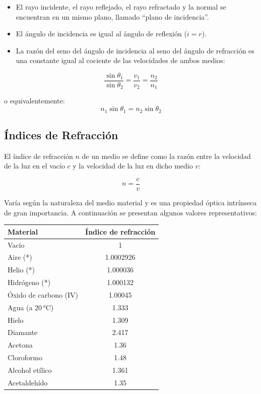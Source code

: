 \documentclass[12pt, a4paper]{article}
\theoremstyle{definition}
\begin{document}
\begin{itemize}
  \item El rayo incidente, el rayo reflejado, el rayo refractado y la normal se encuentran en
        un mismo plano, llamado ``plano de incidencia''.
  \item El ángulo de incidencia es igual al ángulo de reflexión (\(i = r\)).
  \item La razón del seno del ángulo de incidencia al seno del ángulo de refracción es una
        constante igual al cociente de las velocidades de ambos medios:
\end{itemize}

\begin{equation}
  \frac{\sin\theta_1}{\sin\theta_2} = \frac{v_1}{v_2} = \frac{n_2}{n_1}
  \label{eq:snell}
\end{equation}

o equivalentemente:
\begin{equation}
  n_1 \sin\theta_1 = n_2 \sin\theta_2
  \label{eq:snell2}
\end{equation}

\subsection{Índices de Refracción}

El índice de refracción \(n\) de un medio se define como la razón entre la velocidad de la luz
en el vacío \(c\) y la velocidad de la luz en dicho medio \(v\):

\begin{equation}
  n = \frac{c}{v}
  \label{eq:indice_refraccion}
\end{equation}

Varía según la naturaleza del medio material y es una propiedad óptica intrínseca de gran
importancia. A continuación se presentan algunos valores representativos:

\begin{center}
\begin{tabular}{@{}lc@{}}
\toprule
\textbf{Material} & \textbf{Índice de refracción} \\
\midrule
Vacío             & 1 \\
Aire (*)          & 1.0002926 \\
Helio (*)         & 1.000036 \\
Hidrógeno (*)     & 1.000132 \\
Óxido de carbono (IV) & 1.00045 \\
Agua (a 20\,°C)   & 1.333 \\
Hielo             & 1.309 \\
Diamante          & 2.417 \\
Acetona           & 1.36 \\
Cloroformo        & 1.48 \\
Alcohol etílico   & 1.361 \\
Acetaldehído      & 1.35 \\
\bottomrule
\end{tabular}
\end{center}
\end{document}
